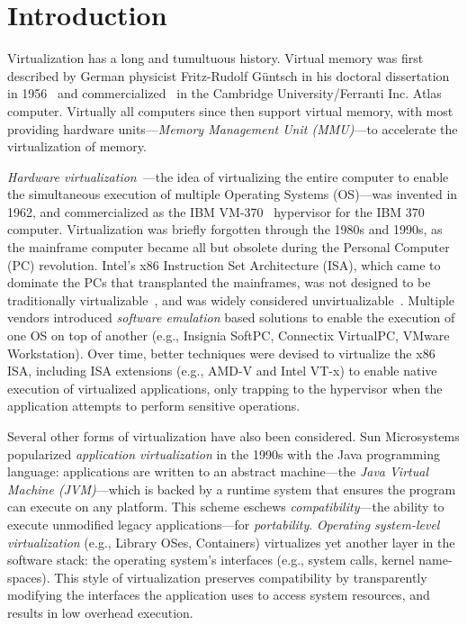 \section{Introduction}
\label{sec:intro}

Virtualization has a long and tumultuous history. Virtual memory was first
described by German physicist Fritz-Rudolf Güntsch in his doctoral
dissertation in 1956~\cite{virtual-memory} and commercialized~\cite{atlas-vm}
in the Cambridge University/Ferranti Inc. Atlas computer. Virtually all
computers since then support virtual memory, with most providing hardware
units---\emph{Memory Management Unit (MMU)}---to accelerate the virtualization
of memory.

\emph{Hardware virtualization}~\cite{cp40}---the idea of virtualizing the
entire computer to enable the simultaneous execution of multiple Operating
Systems (OS)---was invented in 1962, and commercialized as the IBM
VM-370~\cite{vm370} hypervisor for the IBM 370 computer.
Virtualization was briefly forgotten through the 1980s and 1990s, as the
mainframe computer became all but obsolete during the Personal Computer (PC)
revolution. Intel's x86 Instruction Set Architecture (ISA), which came to
dominate the PCs that transplanted the mainframes, was not designed to be
traditionally virtualizable~\cite{popek-goldberg}, and was widely considered
unvirtualizable~\cite{gelsinger-pc,bugnion-workstation}. Multiple vendors
introduced \emph{software emulation} based solutions to enable the execution
of one OS on top of another (e.g., Insignia SoftPC, Connectix VirtualPC,
VMware Workstation). Over time, better techniques were devised to virtualize
the x86 ISA, including ISA extensions (e.g., AMD-V and Intel VT-x) to enable
native execution of virtualized applications, only trapping to the hypervisor
when the application attempts to perform sensitive operations.

Several other forms of virtualization have also been considered.
Sun Microsystems popularized \emph{application virtualization} in the 1990s
with the Java programming language: applications are written to an abstract
machine---the \emph{Java Virtual Machine (JVM)}---which is backed by a runtime
system that ensures the program can execute on any platform.
This scheme eschews \emph{compatibility}---the ability to execute unmodified
legacy applications---for \emph{portability}.
\emph{Operating system-level virtualization} (e.g., Library OSes, Containers)
virtualizes yet another layer in the software stack: the operating system's
interfaces (e.g., system calls, kernel name-spaces). This style of
virtualization preserves compatibility by transparently modifying the
interfaces the application uses to access system resources, and results in
low overhead execution.

